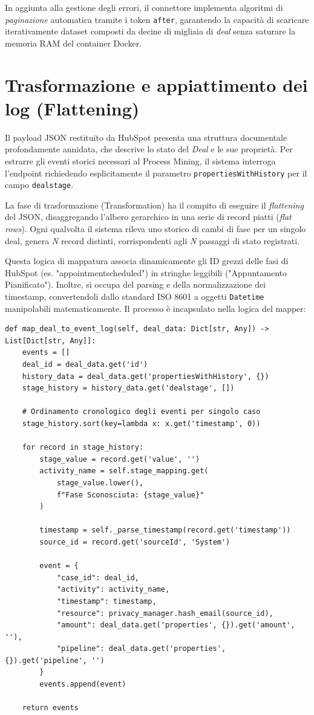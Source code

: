 \documentclass[12pt, a4paper]{report}
\begin{document}
In aggiunta alla gestione degli errori, il connettore implementa algoritmi di \textit{paginazione} automatica tramite i token \texttt{after}, garantendo la capacità di scaricare iterativamente dataset composti da decine di migliaia di \textit{deal} senza saturare la memoria RAM del container Docker.

\section{Trasformazione e appiattimento dei log (Flattening)}
Il payload JSON restituito da HubSpot presenta una struttura documentale profondamente annidata, che descrive lo stato del \textit{Deal} e le sue proprietà. Per estrarre gli eventi storici necessari al Process Mining, il sistema interroga l'endpoint richiedendo esplicitamente il parametro \texttt{propertiesWithHistory} per il campo \texttt{dealstage}.

La fase di trasformazione (Transformation) ha il compito di eseguire il \textit{flattening} del JSON, disaggregando l'albero gerarchico in una serie di record piatti (\textit{flat rows}). Ogni qualvolta il sistema rileva uno storico di cambi di fase per un singolo deal, genera \textit{N} record distinti, corrispondenti agli \textit{N} passaggi di stato registrati. 

Questa logica di mappatura associa dinamicamente gli ID grezzi delle fasi di HubSpot (es. "appointmentscheduled") in stringhe leggibili ("Appuntamento Pianificato"). Inoltre, si occupa del parsing e della normalizzazione dei timestamp, convertendoli dallo standard ISO 8601 a oggetti \texttt{Datetime} manipolabili matematicamente. Il processo è incapsulato nella logica del mapper:

\begin{verbatim}
def map_deal_to_event_log(self, deal_data: Dict[str, Any]) -> List[Dict[str, Any]]:
    events = []
    deal_id = deal_data.get('id')
    history_data = deal_data.get('propertiesWithHistory', {})
    stage_history = history_data.get('dealstage', [])
    
    # Ordinamento cronologico degli eventi per singolo caso
    stage_history.sort(key=lambda x: x.get('timestamp', 0))
    
    for record in stage_history:
        stage_value = record.get('value', '')
        activity_name = self.stage_mapping.get(
            stage_value.lower(), 
            f"Fase Sconosciuta: {stage_value}"
        )
        
        timestamp = self._parse_timestamp(record.get('timestamp'))
        source_id = record.get('sourceId', 'System')
        
        event = {
            "case_id": deal_id,
            "activity": activity_name,
            "timestamp": timestamp,
            "resource": privacy_manager.hash_email(source_id),
            "amount": deal_data.get('properties', {}).get('amount', ''),
            "pipeline": deal_data.get('properties', {}).get('pipeline', '')
        }
        events.append(event)
    
    return events
\end{verbatim}
\end{document}
